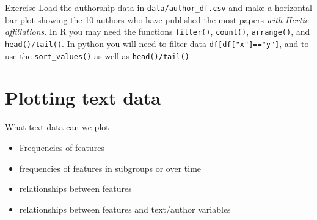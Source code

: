 \documentclass[
  10pt,
  ignorenonframetext,
  aspectratio=169]{beamer}
\providecommand{\tightlist}{%
  \setlength{\itemsep}{0pt}\setlength{\parskip}{0pt}}
\begin{document}
\begin{frame}[fragile]{Exercise}
\protect\hypertarget{exercise}{}
Load the authorship data in \texttt{data/author\_df.csv} and make a
horizontal bar plot showing the 10 authors who have published the most
papers \emph{with Hertie affiliations}. In R you may need the functions
\texttt{filter()}, \texttt{count()}, \texttt{arrange()}, and
\texttt{head()/tail()}. In python you will need to filter data
\texttt{df{[}df{[}"x"{]}=="y"{]}}, and to use the
\texttt{sort\_values()} as well as \texttt{head()/tail()}
\end{frame}

\hypertarget{plotting-text-data}{%
\section{Plotting text data}\label{plotting-text-data}}

\begin{frame}{What text data can we plot}
\protect\hypertarget{what-text-data-can-we-plot}{}
\begin{itemize}
\tightlist
\item
  Frequencies of features
\item
  frequencies of features in subgroups or over time
\item
  relationships between features
\item
  relationships between features and text/author variables
\end{itemize}
\end{frame}
\end{document}
